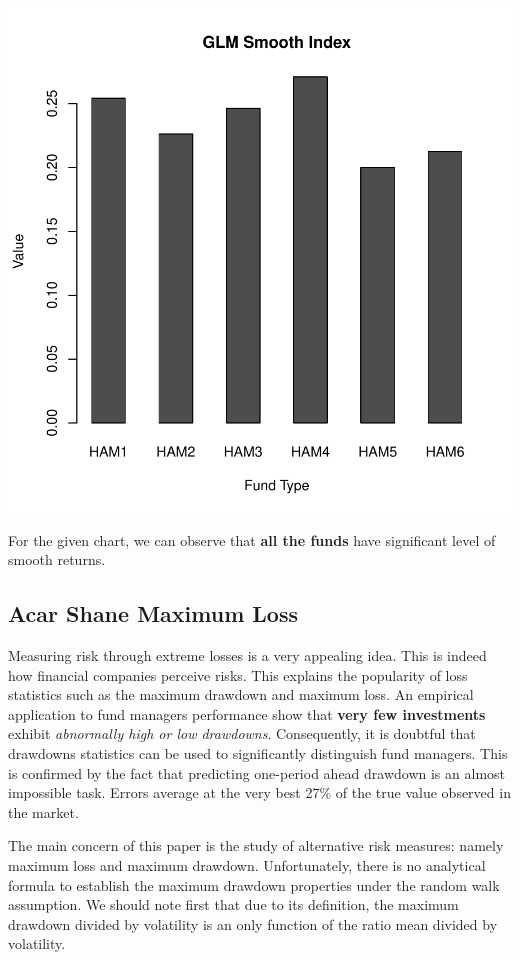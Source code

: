 \documentclass[12pt,letterpaper,english]{article}
\begin{document}
\includegraphics{Managers-008}

For the given chart, we can observe that \textbf{all the funds} have significant level of smooth returns.
\subsection{Acar Shane Maximum Loss}

Measuring risk through extreme losses is a very appealing idea. This is indeed how financial  companies perceive risks. This explains the popularity of loss statistics such as the maximum  drawdown and maximum loss. An empirical application to fund managers performance show that \textbf{very few investments} exhibit  \emph{abnormally high or low drawdowns}. Consequently, it is doubtful that drawdowns statistics can be used 
to significantly distinguish fund managers. This is confirmed by the fact that predicting one-period  ahead drawdown is an almost impossible task. Errors average at the very best 27\% of the true value  observed in the market.

The main concern of this paper is the study of alternative risk measures: namely maximum loss and  maximum drawdown. Unfortunately, there is no analytical formula to establish the maximum drawdown properties under the random walk assumption. We should note first that due to its definition, the maximum drawdown divided by volatility is an only function of the ratio mean divided by volatility.
\end{document}

